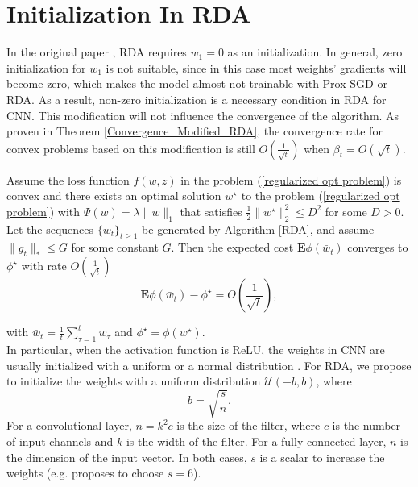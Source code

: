 \section{Initialization In RDA}\label{sec_ini}
In the original paper \cite{xiao2010dual}, RDA requires $w_1=0$ as an initialization. 
In general, zero initialization for $w_1$ is not suitable, since in this case most weights' gradients will become zero, which makes the model almost not trainable with Prox-SGD or RDA. As a result, non-zero initialization is a necessary condition in RDA for CNN. This modification will not influence the convergence of the algorithm. As proven in Theorem \ref{Convergence_Modified_RDA}, the convergence rate for convex problems based on this modification is still $O(\frac{1}{\sqrt t})$ when $\beta_t=O(\sqrt{t})$.  
\begin{theorem}\label{Convergence_Modified_RDA}
	Assume the loss function $f(w,z)$ in the problem (\ref{regularized opt problem}) is convex and there exists an optimal solution $w^{\star}$ to the problem (\ref{regularized opt problem}) with $\Psi(w)=\lambda\|w\|_1$ that satisfies $\frac{1}{2}\|w^{\star}\|_{2}^2\leq D^2$ for some $D>0$. Let the sequences $\{w_t\}_{t\geq 1}$ be generated by Algorithm \ref{RDA}, and assume $\|g_t\|_{\ast}\leq G$ for some constant $G$. Then the expected cost $\mathbf{E}\phi(\bar{w}_t)$ converges to $\phi^{\star}$ with rate $O(\frac{1}{\sqrt{t}})$
	$$
	\mathbf{E}\phi(\bar{w}_t)-\phi^{\star}= O(\frac{1}{\sqrt{t}}),
	$$
\end{theorem}
with $\bar w_t=\frac{1}{t} \sum_{\tau=1}^{t} w_\tau$ and $\phi^{\star}=\phi(w^{\star})$. \\
%
In particular, when the activation function is ReLU, the weights in CNN are usually initialized with a uniform or a normal distribution \cite{lecun2012efficient,glorot2010understanding,he2015delving}. For RDA, we propose to initialize the weights with a uniform distribution $\mathcal{U}(-b,b)$, where 
\begin{equation}
b=\sqrt{\frac{s}{n}}.
\end{equation}
For a convolutional layer, $n=k^2 c$ is the size of the filter, where $c$ is the number of input channels and $k$ is the width of the filter. For a fully connected layer, $n$ is the dimension of the input vector. In both cases, $s$ is a scalar to increase the weights (e.g. \cite{he2015delving} proposes to choose $s=6$). 

